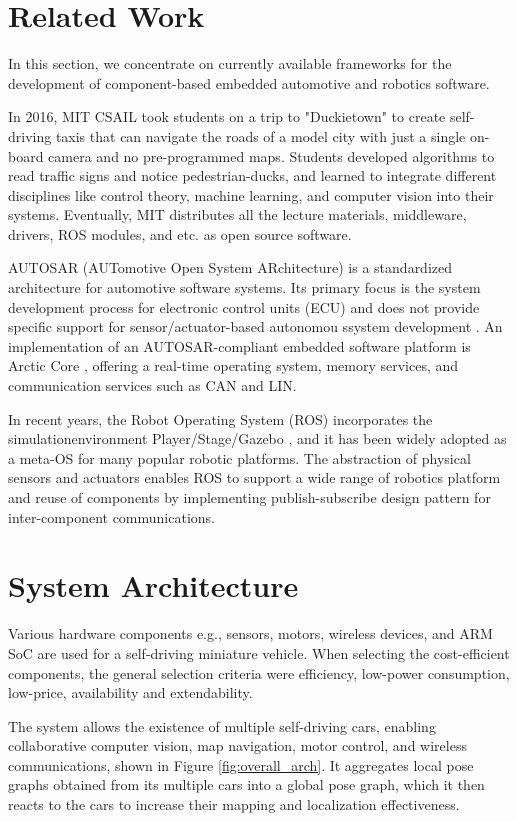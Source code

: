 \documentclass[conference]{IEEEtran}
\begin{document}
\section{Related Work}

In this section, we concentrate on currently available frameworks for the development of component-based embedded automotive and robotics software.

In 2016, MIT CSAIL took students on a trip to "Duckietown" \cite{Duckietown} to create self-driving taxis that can navigate the roads of a model city with just a single on-board camera and no pre-programmed maps. Students developed algorithms to read traffic signs and notice pedestrian-ducks, and learned to integrate different disciplines like control theory, machine learning, and computer vision into their systems. Eventually, MIT distributes all the lecture materials, middleware, drivers, ROS modules, and etc. as open source software.

AUTOSAR (AUTomotive Open System ARchitecture) is a standardized architecture for automotive software systems. Its primary focus is the system development process for electronic control units (ECU) and does not provide specific support for sensor/actuator-based autonomou ssystem development \cite{rtes}. An implementation of an AUTOSAR-compliant embedded software platform is Arctic Core \cite{arctic-core}, offering a real-time operating system, memory services, and communication services such as CAN and LIN.

In recent years, the Robot Operating System (ROS) \cite{ROS} incorporates the simulationenvironment Player/Stage/Gazebo \cite{player/stage}, and it has been widely adopted as a meta-OS for many popular robotic platforms. The abstraction of physical sensors and actuators enables ROS to support a wide range of robotics platform and reuse of components by implementing publish-subscribe design pattern for inter-component communications.

\section{System Architecture}

Various hardware components e.g., sensors, motors, wireless devices, and ARM SoC are used for a self-driving miniature vehicle. When selecting the cost-efficient components, the general
selection criteria were efficiency, low-power consumption, low-price, availability and extendability.

The system allows the existence of multiple self-driving cars, enabling collaborative computer vision, map navigation, motor control, and wireless communications, shown in Figure \ref{fig:overall_arch}. It aggregates local pose graphs obtained from its multiple cars into a global pose graph, which it then reacts to the cars to increase their mapping and localization effectiveness.
\end{document}
